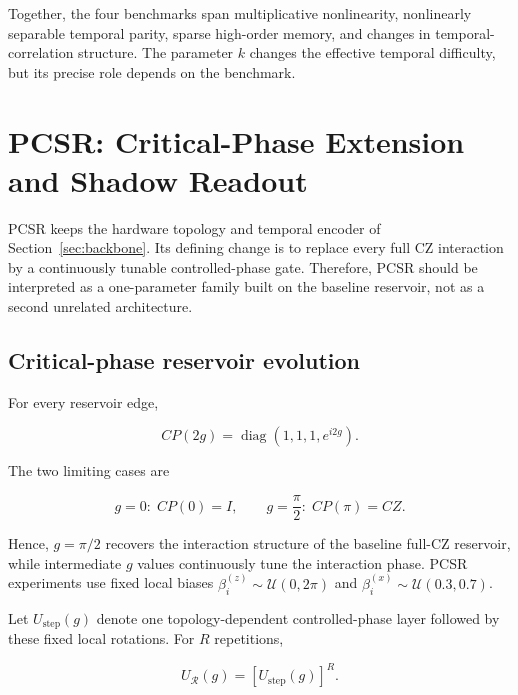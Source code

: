 \documentclass[final,1p,times]{elsarticle}
\begin{document}
Together, the four benchmarks span multiplicative nonlinearity,
nonlinearly separable temporal parity, sparse high-order memory, and
changes in temporal-correlation structure. The parameter $k$ changes
the effective temporal difficulty, but its precise role depends on the
benchmark.

\section{PCSR: Critical-Phase Extension and Shadow Readout}
\label{sec:pcsr}

PCSR keeps the hardware topology and temporal encoder of
Section~\ref{sec:backbone}. Its defining change is to replace every
full CZ interaction by a continuously tunable controlled-phase gate.
Therefore, PCSR should be interpreted as a one-parameter family built
on the baseline reservoir, not as a second unrelated architecture.

\subsection{Critical-phase reservoir evolution}

For every reservoir edge,

\begin{equation}
CP(2g)
=
\operatorname{diag}(1,1,1,e^{i2g}).
\label{eq:critical_cp}
\end{equation}

The two limiting cases are

\begin{equation}
g=0:\;CP(0)=I,
\qquad
g=\frac{\pi}{2}:\;CP(\pi)=CZ.
\label{eq:g_limits}
\end{equation}

Hence, $g=\pi/2$ recovers the interaction structure of the baseline
full-CZ reservoir, while intermediate $g$ values continuously tune the
interaction phase. PCSR experiments use fixed local biases
$\beta_i^{(z)}\sim\mathcal U(0,2\pi)$ and
$\beta_i^{(x)}\sim\mathcal U(0.3,0.7)$.

Let $U_{\mathrm{step}}(g)$ denote one topology-dependent controlled-phase
layer followed by these fixed local rotations. For $R$ repetitions,

\begin{equation}
U_{\mathcal R}(g)
=
[U_{\mathrm{step}}(g)]^R.
\label{eq:pcsr_repeated_unitary}
\end{equation}
\end{document}
